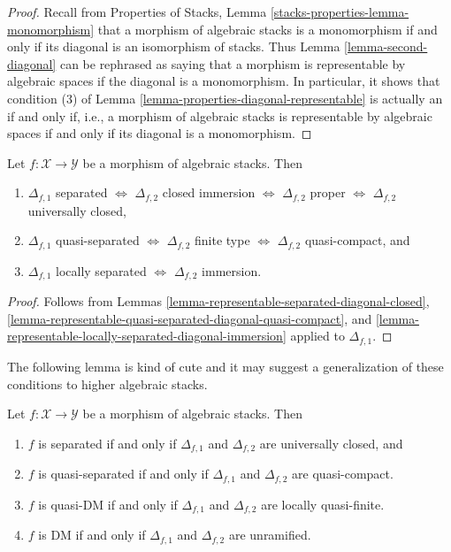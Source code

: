 \begin{proof}
Recall from Properties of Stacks, Lemma
\ref{stacks-properties-lemma-monomorphism}
that a morphism of algebraic stacks is a monomorphism
if and only if its diagonal is an isomorphism of stacks.
Thus Lemma \ref{lemma-second-diagonal}
can be rephrased as saying that a morphism is
representable by algebraic spaces if the diagonal
is a monomorphism. In particular, it shows that condition
(3) of Lemma \ref{lemma-properties-diagonal-representable}
is actually an if and only if, i.e., a morphism of algebraic stacks
is representable by algebraic spaces if and only if
its diagonal is a monomorphism.
\end{proof}

\begin{lemma}
\label{lemma-first-diagonal-separated-second-diagonal-closed}
Let $f : \mathcal{X} \to \mathcal{Y}$ be a morphism of algebraic stacks.
Then
\begin{enumerate}
\item $\Delta_{f, 1}$ separated $\Leftrightarrow$
$\Delta_{f, 2}$ closed immersion $\Leftrightarrow$
$\Delta_{f, 2}$ proper $\Leftrightarrow$
$\Delta_{f, 2}$ universally closed,
\item $\Delta_{f, 1}$ quasi-separated $\Leftrightarrow$
$\Delta_{f, 2}$ finite type $\Leftrightarrow$ $\Delta_{f, 2}$ quasi-compact,
and
\item $\Delta_{f, 1}$ locally separated $\Leftrightarrow$
$\Delta_{f, 2}$ immersion.
\end{enumerate}
\end{lemma}

\begin{proof}
Follows from
Lemmas \ref{lemma-representable-separated-diagonal-closed},
\ref{lemma-representable-quasi-separated-diagonal-quasi-compact}, and
\ref{lemma-representable-locally-separated-diagonal-immersion}
applied to $\Delta_{f, 1}$.
\end{proof}

\noindent
The following lemma is kind of cute and it may suggest a generalization
of these conditions to higher algebraic stacks.

\begin{lemma}
\label{lemma-definition-separated}
Let $f : \mathcal{X} \to \mathcal{Y}$ be a morphism of algebraic stacks.
Then
\begin{enumerate}
\item $f$ is separated if and only if $\Delta_{f, 1}$ and $\Delta_{f, 2}$
are universally closed, and
\item $f$ is quasi-separated if and only if $\Delta_{f, 1}$ and $\Delta_{f, 2}$
are quasi-compact.
\item $f$ is quasi-DM if and only if $\Delta_{f, 1}$ and $\Delta_{f, 2}$
are locally quasi-finite.
\item $f$ is DM if and only if $\Delta_{f, 1}$ and $\Delta_{f, 2}$
are unramified.
\end{enumerate}
\end{lemma}

